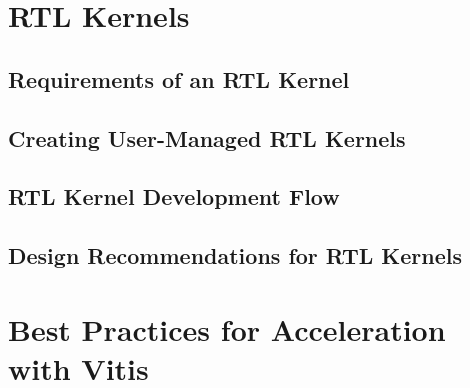 \section{RTL Kernels}
\subsection{Requirements of an RTL Kernel}
\subsection{Creating User-Managed RTL Kernels}
\subsection{RTL Kernel Development Flow}
\subsection{Design Recommendations for RTL Kernels}

\section{Best Practices for Acceleration with Vitis} 




